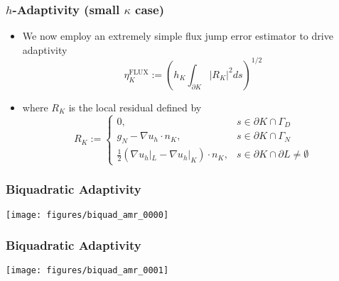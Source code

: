 \begin{frame}
  \frametitle{$h$-Adaptivity (small $\kappa$ case)}
  \begin{itemize}
    \item{We now employ an extremely simple flux jump error estimator to drive adaptivity
  \begin{equation}
    \nonumber
    \eta^{\text{FLUX}}_K := \left( {h_K} \int_{\partial K} |R_K|^2 ds \right)^{1/2}
    \label{eqn:flux_indicator}
  \end{equation}
  }

    \item{
where $R_K$ is the local residual defined by
\begin{equation}
  \nonumber
  R_K := \left\{
    \begin{array}{cl}
      0, & s \in \partial K \cap \Gamma_D \\
      g_N - \nabla u_h \cdot n_K, & s \in \partial K \cap \Gamma_N \\
      \frac{1}{2}(\nabla u_h|_L - \nabla u_h|_K) \cdot n_K, & s \in \partial K \cap \partial L \neq \emptyset
    \end{array}
    \right.
  \label{eqn:residual}
\end{equation}
}
  \end{itemize}
\end{frame}


\begin{frame}
  \frametitle{Biquadratic Adaptivity}
  \begin{center}
	\texttt{[image: figures/biquad\_amr\_0000]}    
  \end{center}
\end{frame}
  
\begin{frame}
  \frametitle{Biquadratic Adaptivity}
  \begin{center}
	\texttt{[image: figures/biquad\_amr\_0001]}    
  \end{center}
\end{frame}

